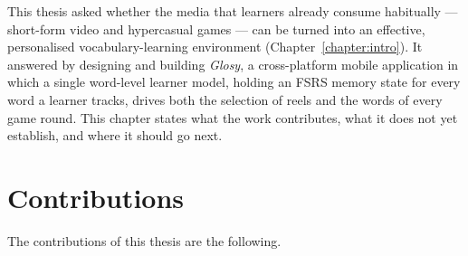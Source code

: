 This thesis asked whether the media that learners already consume habitually --- short-form video and hypercasual games --- can be turned into an effective, personalised vocabulary-learning environment (Chapter~\ref{chapter:intro}). It answered by designing and building \textit{Glosy}, a cross-platform mobile application in which a single word-level learner model, holding an FSRS memory state for every word a learner tracks, drives both the selection of reels and the words of every game round. This chapter states what the work contributes, what it does not yet establish, and where it should go next.

\section{Contributions}
\label{sec:contributions}
    The contributions of this thesis are the following.

